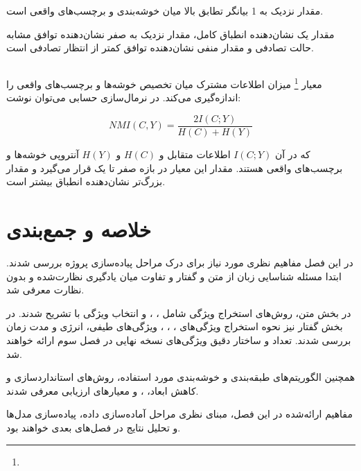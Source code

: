 مقدار نزدیک به 1 بیانگر تطابق بالا میان خوشه‌بندی و برچسب‌های واقعی است.

مقدار یک نشان‌دهنده انطباق کامل، مقدار نزدیک به صفر نشان‌دهنده توافق مشابه حالت تصادفی و مقدار منفی نشان‌دهنده توافق کمتر از انتظار تصادفی است.


\subsection{}

معیار
\footnote{}
میزان اطلاعات مشترک میان تخصیص خوشه‌ها و برچسب‌های واقعی را اندازه‌گیری می‌کند. در نرمال‌سازی حسابی می‌توان نوشت:

\begin{equation}
NMI(C,Y)
=
\frac{2I(C;Y)}{H(C)+H(Y)}
\end{equation}

که در آن $I(C;Y)$ اطلاعات متقابل و $H(C)$ و $H(Y)$ آنتروپی خوشه‌ها و برچسب‌های واقعی هستند. مقدار این معیار در بازه صفر تا یک قرار می‌گیرد و مقدار بزرگ‌تر نشان‌دهنده انطباق بیشتر است.


\section{خلاصه و جمع‌بندی}

در این فصل مفاهیم نظری مورد نیاز برای درک مراحل پیاده‌سازی پروژه بررسی شدند. ابتدا مسئله شناسایی زبان از متن و گفتار و تفاوت میان یادگیری نظارت‌شده و بدون نظارت معرفی شد.

در بخش متن، روش‌های استخراج ویژگی شامل
،
،
و انتخاب ویژگی با
تشریح شدند. در بخش گفتار نیز نحوه استخراج ویژگی‌های
،
،
،
ویژگی‌های طیفی، انرژی و مدت زمان بررسی شدند. تعداد و ساختار دقیق ویژگی‌های نسخه نهایی در فصل سوم ارائه خواهند شد.

همچنین الگوریتم‌های طبقه‌بندی و خوشه‌بندی مورد استفاده، روش‌های استانداردسازی و کاهش ابعاد،
،
و معیارهای ارزیابی معرفی شدند.

مفاهیم ارائه‌شده در این فصل، مبنای نظری مراحل آماده‌سازی داده، پیاده‌سازی مدل‌ها و تحلیل نتایج در فصل‌های بعدی خواهند بود.


